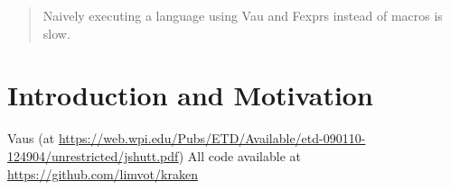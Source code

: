 \documentclass[acmsmall]{acmart}
\begin{document}
\begin{abstract}
  Naively executing a language using Vau and Fexprs instead of macros
  is slow.
\end{abstract}






\section{Introduction and Motivation}
    Vaus \cite{shutt2010fexprs} (at \url{https://web.wpi.edu/Pubs/ETD/Available/etd-090110-124904/unrestricted/jshutt.pdf})
    All code available at \url{https://github.com/limvot/kraken}
\end{document}
